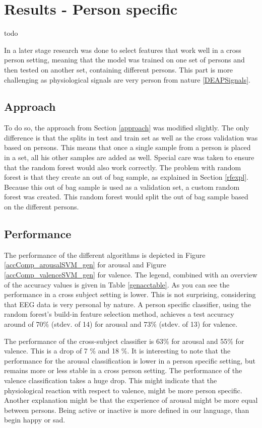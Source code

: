 \chapter{Results - Person specific}
{\samenvatting todo}

In a later stage research was done to select features that work well in a cross person setting, meaning that the model was trained on one set of persons and then tested on another set, containing different persons. This part is more challenging as physiological signals are very person from nature \ref{DEAPSignals}.

\section{Approach}

To do so, the approach from Section \ref{approach} was modified slightly. The only difference is that the splits in test and train set as well as the cross validation was based on persons. This means that once a single sample from a person is placed in a set, all his other samples are added as well. Special care was taken to ensure that the random forest would also work correctly. The problem with random forest is that they create an out of bag sample, as explained in Section \ref{rfexpl}. Because this out of bag sample is used as a validation set, a custom random forest was created. This random forest would split the out of bag sample based on the different persons.

\section{Performance}
The performance of the different algorithms is depicted in Figure \ref{accComp_arousalSVM_gen} for arousal and Figure \ref{accComp_valenceSVM_gen} for valence. The legend, combined with an overview of the accuracy values is given in Table \ref{genacctable}. As you can see the performance in a cross subject setting is lower. This is not surprising, considering that EEG data is very personal by nature. A person specific classifier, using the random forest's build-in feature selection method, achieves a test accuracy around of 70\% (stdev. of 14) for arousal and 73\% (stdev. of 13) for valence.

\npar

The performance of the cross-subject classifier is 63\% for arousal and 55\% for valence. This is a drop of 7 \% and 18 \%. It is interesting to note that the performance for the arousal classification is lower in a person specific setting, but remains more or less stable in a cross person setting. The performance of the valence classification takes a huge drop. This might indicate that the physiological reaction with respect to valence, might be more person specific. Another explanation might be that the experience of arousal might be more equal between persons. Being active or inactive is more defined in our language, than begin happy or sad. %

